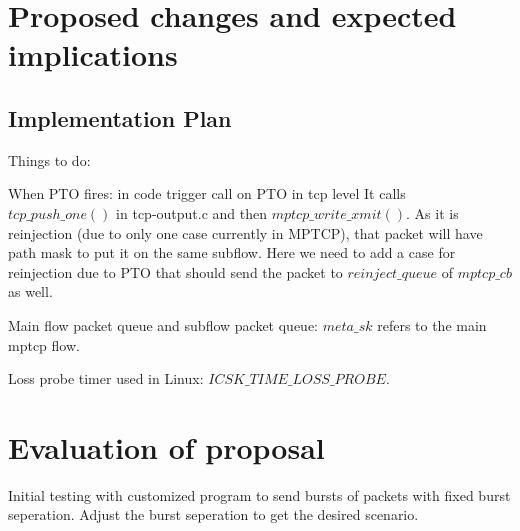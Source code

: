 \documentclass[10pt,draftcls,twocolumn]{IEEEconf}
\begin{document}
\section{Proposed changes and expected implications}


\subsection{Implementation Plan}

Things to do:



When PTO fires: in code trigger call on PTO in tcp level
It calls ${tcp\_push\_one()}$ in tcp-output.c and then ${mptcp\_write\_xmit()}$.
As it is reinjection (due to only one case currently in MPTCP), that packet will have path mask
to put it on the same subflow. Here we need to add a case for reinjection due to PTO that should
send the packet to $reinject\_queue$ of ${mptcp\_cb}$ as well.


Main flow packet queue and subflow packet queue: ${meta\_sk}$ refers to the
main mptcp flow.

Loss probe timer used in Linux: ${ICSK\_TIME\_LOSS\_PROBE}$.

\section{Evaluation of proposal}

Initial testing with customized program to send bursts of packets with fixed burst seperation. Adjust the burst seperation to get the desired scenario.







\end{document}
